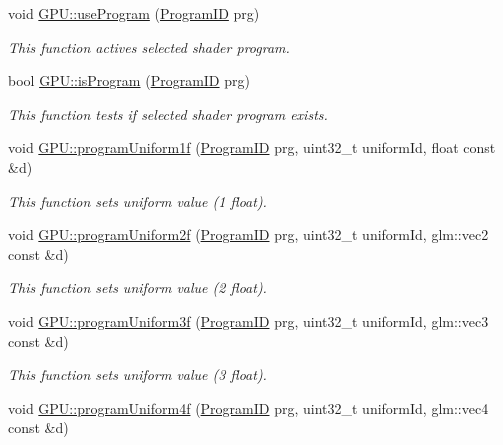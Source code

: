 \begin{DoxyCompactItemize}
void \hyperlink{group__program__tasks_ga4f2bd468b0ef5fed61ffa34314319a20}{G\+P\+U\+::use\+Program} (\hyperlink{fwd_8hpp_a46ffd067c21ab50f5f1fcfed5d8bfc15}{Program\+ID} prg)
\begin{DoxyCompactList}\small\item\em This function actives selected shader program. \end{DoxyCompactList}\item 
bool \hyperlink{group__program__tasks_ga481c0eb5be3150af401a58fa167506e0}{G\+P\+U\+::is\+Program} (\hyperlink{fwd_8hpp_a46ffd067c21ab50f5f1fcfed5d8bfc15}{Program\+ID} prg)
\begin{DoxyCompactList}\small\item\em This function tests if selected shader program exists. \end{DoxyCompactList}\item 
void \hyperlink{group__program__tasks_gaa9e9717db5520e6c34a1b380d6321758}{G\+P\+U\+::program\+Uniform1f} (\hyperlink{fwd_8hpp_a46ffd067c21ab50f5f1fcfed5d8bfc15}{Program\+ID} prg, uint32\+\_\+t uniform\+Id, float const \&d)
\begin{DoxyCompactList}\small\item\em This function sets uniform value (1 float). \end{DoxyCompactList}\item 
void \hyperlink{group__program__tasks_gac34e13783980686c497adda156923b1d}{G\+P\+U\+::program\+Uniform2f} (\hyperlink{fwd_8hpp_a46ffd067c21ab50f5f1fcfed5d8bfc15}{Program\+ID} prg, uint32\+\_\+t uniform\+Id, glm\+::vec2 const \&d)
\begin{DoxyCompactList}\small\item\em This function sets uniform value (2 float). \end{DoxyCompactList}\item 
void \hyperlink{group__program__tasks_ga06b1aca1375a9cfff13d3b66defe485f}{G\+P\+U\+::program\+Uniform3f} (\hyperlink{fwd_8hpp_a46ffd067c21ab50f5f1fcfed5d8bfc15}{Program\+ID} prg, uint32\+\_\+t uniform\+Id, glm\+::vec3 const \&d)
\begin{DoxyCompactList}\small\item\em This function sets uniform value (3 float). \end{DoxyCompactList}\item 
void \hyperlink{group__program__tasks_gad703e87e1652a78261739c6b5108c852}{G\+P\+U\+::program\+Uniform4f} (\hyperlink{fwd_8hpp_a46ffd067c21ab50f5f1fcfed5d8bfc15}{Program\+ID} prg, uint32\+\_\+t uniform\+Id, glm\+::vec4 const \&d)

\end{DoxyCompactItemize}
